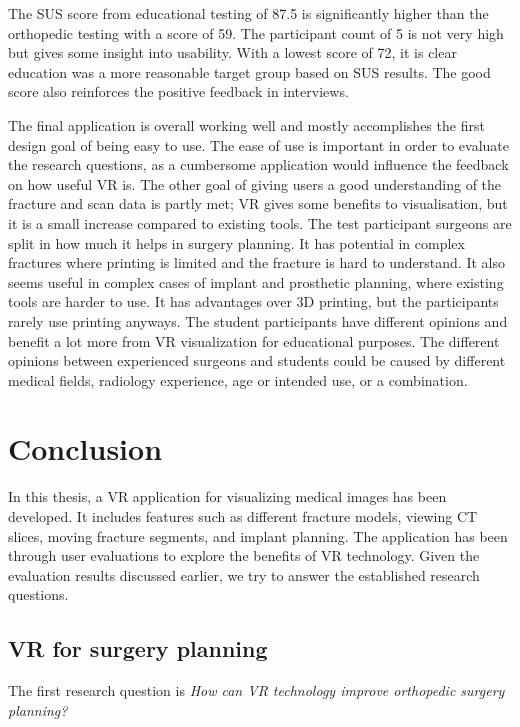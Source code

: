 \documentclass[a4paper]{report}
\begin{document}
The SUS score from educational testing of 87.5 is significantly higher than the orthopedic testing with a score of 59.
The participant count of 5 is not very high but gives some insight into usability. With a lowest score of 72, it is clear education was a more reasonable target group based on SUS results. The good score also reinforces the positive feedback in interviews.

The final application is overall working well and mostly accomplishes the first design goal of being easy to use. The ease of use is important in order to evaluate the research questions, as a cumbersome application would influence the feedback on how useful VR is.
The other goal of giving users a good understanding of the fracture and scan data is partly met; VR gives some benefits to visualisation, but it is a small increase compared to existing tools.
The test participant surgeons are split in how much it helps in surgery planning.
It has potential in complex fractures where printing is limited and the fracture is hard to understand. It also seems useful in complex cases of implant and prosthetic planning, where existing tools are harder to use.
It has advantages over 3D printing, but the participants rarely use printing anyways.
The student participants have different opinions and benefit a lot more from VR visualization for educational purposes. The different opinions between experienced surgeons and students could be caused by different medical fields, radiology experience, age or intended use, or a combination.





\chapter{Conclusion}
In this thesis, a VR application for visualizing medical images has been developed. It includes features such as different fracture models, viewing CT slices, moving fracture segments, and implant planning.
The application has been through user evaluations to explore the benefits of VR technology.
Given the evaluation results discussed earlier, we try to answer the established research questions.

\section{VR for surgery planning}

The first research question is \emph{How can VR technology improve orthopedic surgery planning?}
\end{document}
